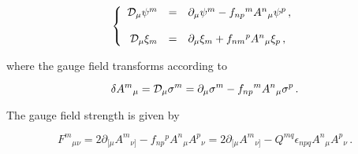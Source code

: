 \documentclass[12pt,a4paper]{article}
\begin{document}
\begin{equation}
\left\{
\begin{array}{rcl}
{\cal D}_{\mu}\psi^{m} & = & 
\partial_{\mu}\psi^{m}-f_{np}{}^{m}A^{n}{}_{\mu}\psi^{p}\, ,\\
& & \\
{\cal D}_{\mu}\xi_{m} & = & 
\partial_{\mu}\xi_{m}+f_{nm}{}^{p}A^{n}{}_{\mu}\xi_{p}\, ,\\
\end{array}
\right.
\end{equation}


\noindent where the gauge field transforms according to

\begin{equation}
\delta A^{m}{}_{\mu}= {\cal D}_{\mu}\sigma^{m}= 
\partial_{\mu}\sigma^{m}-f_{np}{}^{m}A^{n}{}_{\mu}\sigma^{p}\, .
\end{equation}

The gauge field strength is given by

\begin{equation}
F^{m}{}_{\mu\nu} = 2\partial_{[\mu}A^{m}{}_{\nu]} 
-f_{np}{}^{p}A^{n}{}_{\mu}A^{p}{}_{\nu}=
 2\partial_{[\mu}A^{m}{}_{\nu]} 
-Q^{mq}\epsilon_{npq}A^{n}{}_{\mu}A^{p}{}_{\nu}\, .   
\end{equation}
\end{document}
